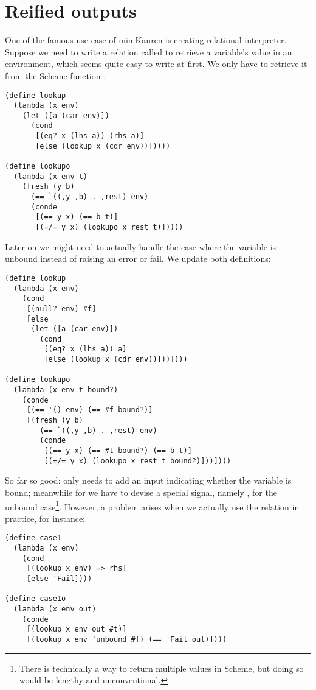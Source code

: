 \section{Reified outputs}\label{reif}
One of the famous use case of miniKanren is creating relational interpreter. Suppose we need to write a relation called  to retrieve a variable's value in an environment, which seems quite easy to write at first. We only have to retrieve it from the Scheme function .
\begin{lstlisting}
(define lookup
  (lambda (x env)
    (let ([a (car env)])
      (cond
       [(eq? x (lhs a)) (rhs a)]
       [else (lookup x (cdr env))]))))

(define lookupo
  (lambda (x env t)
    (fresh (y b)
      (== `((,y ,b) . ,rest) env)
      (conde
       [(== y x) (== b t)]
       [(=/= y x) (lookupo x rest t)]))))
\end{lstlisting}

Later on we might need to actually handle the case where the variable is unbound instead of raising an error or fail. We update both definitions:
\begin{lstlisting}
(define lookup
  (lambda (x env)
    (cond
     [(null? env) #f]
     [else
      (let ([a (car env)])
        (cond
         [(eq? x (lhs a)) a]
         [else (lookup x (cdr env))]))])))

(define lookupo
  (lambda (x env t bound?)
    (conde
     [(== '() env) (== #f bound?)]
     [(fresh (y b)
        (== `((,y ,b) . ,rest) env)
        (conde
         [(== y x) (== #t bound?) (== b t)]
         [(=/= y x) (lookupo x rest t bound?)]))])))
\end{lstlisting}

So far so good:  only needs to add an input indicating whether the variable is bound; meanwhile for  we have to devise a special signal, namely , for the unbound case\footnote{There is technically a way to return multiple values in Scheme, but doing so would be lengthy and unconventional.}. However, a problem arises when we actually use the relation in practice, for instance:
\begin{lstlisting}
(define case1
  (lambda (x env)
    (cond
     [(lookup x env) => rhs]
     [else 'Fail])))

(define case1o
  (lambda (x env out)
    (conde
     [(lookup x env out #t)]
     [(lookup x env 'unbound #f) (== 'Fail out)])))
\end{lstlisting}

